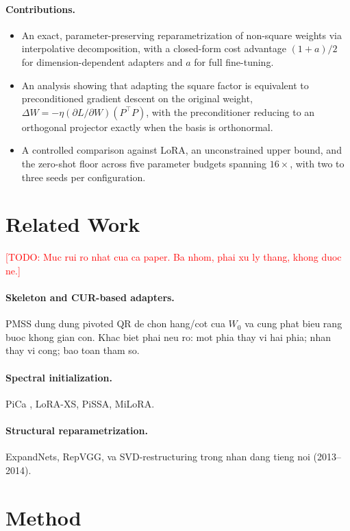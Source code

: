 \documentclass{article}
\newcommand{\TODO}[1]{\textcolor{red}{[TODO: #1]}}
\begin{document}
\paragraph{Contributions.}
\begin{itemize}
  \item An exact, parameter-preserving reparametrization of non-square weights
        via interpolative decomposition, with a closed-form cost advantage
        $(1+a)/2$ for dimension-dependent adapters and $a$ for full
        fine-tuning.
  \item An analysis showing that adapting the square factor is equivalent to
        preconditioned gradient descent on the original weight,
        $\Delta W = -\eta (\partial L/\partial W)(P^\top P)$, with the
        preconditioner reducing to an orthogonal projector exactly when the
        basis is orthonormal.
  \item A controlled comparison against LoRA, an unconstrained upper bound,
        and the zero-shot floor across five parameter budgets spanning
        $16\times$, with two to three seeds per configuration.
\end{itemize}

\section{Related Work}
\TODO{Muc rui ro nhat cua ca paper. Ba nhom, phai xu ly thang, khong duoc ne.}
\paragraph{Skeleton and CUR-based adapters.} PMSS \citep{wang2024pmss} dung
dung pivoted QR de chon hang/cot cua $W_0$ va cung phat bieu rang buoc khong
gian con. Khac biet phai neu ro: mot phia thay vi hai phia; nhan thay vi cong;
bao toan tham so.
\paragraph{Spectral initialization.} PiCa \citep{pica2025}, LoRA-XS, PiSSA,
MiLoRA.
\paragraph{Structural reparametrization.} ExpandNets, RepVGG, va
SVD-restructuring trong nhan dang tieng noi (2013--2014).

\section{Method}
\end{document}
